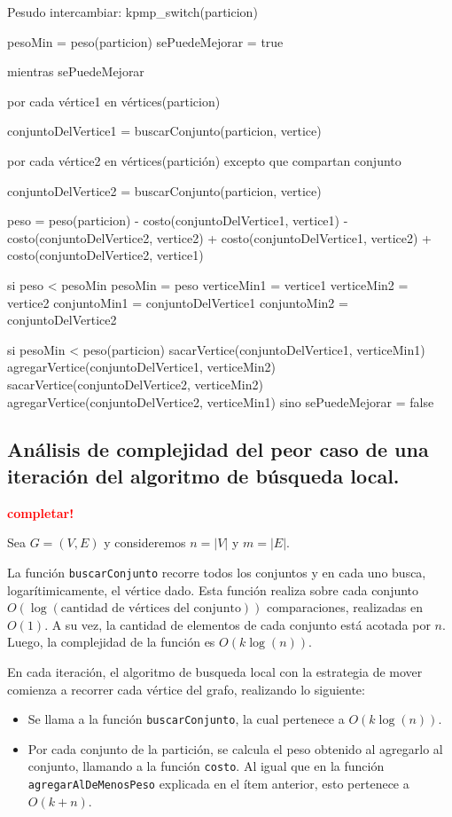 Pesudo intercambiar:
kpmp_switch(particion) {
	pesoMin = peso(particion)
	sePuedeMejorar = true

	mientras sePuedeMejorar {
		por cada vértice1 en vértices(particion) {
			conjuntoDelVertice1 = buscarConjunto(particion, vertice)

			por cada vértice2 en vértices(partición) excepto que compartan conjunto {
				conjuntoDelVertice2 = buscarConjunto(particion, vertice)

				peso = peso(particion)
					- costo(conjuntoDelVertice1, vertice1)
					- costo(conjuntoDelVertice2, vertice2)
					+ costo(conjuntoDelVertice1, vertice2)
					+ costo(conjuntoDelVertice2, vertice1)


				si peso < pesoMin {
					pesoMin = peso
					verticeMin1 = vertice1
					verticeMin2 = vertice2
					conjuntoMin1 = conjuntoDelVertice1
					conjuntoMin2 = conjuntoDelVertice2
				}
			}
		}

		si pesoMin < peso(particion) {
			sacarVertice(conjuntoDelVertice1, verticeMin1)
			agregarVertice(conjuntoDelVertice1, verticeMin2)
			sacarVertice(conjuntoDelVertice2, verticeMin2)
			agregarVertice(conjuntoDelVertice2, verticeMin1)
		} sino {
			sePuedeMejorar = false
		}
	}
}

\newpage
\subsection{Análisis de complejidad del peor caso de una iteración del
            algoritmo de búsqueda local.}
\vspace*{0.3cm}
\textcolor{red}{\textbf{completar!}}

Sea $G = (V, E)$ y consideremos $n = |V|$ y $m = |E|$.

La función \texttt{buscarConjunto} recorre todos los conjuntos y en cada uno
busca, logarítimicamente, el vértice dado. Esta función realiza sobre cada
conjunto $O(\log(\text{cantidad de vértices del conjunto}))$ comparaciones,
realizadas en $O(1)$. A su vez, la cantidad de elementos de cada conjunto está
acotada por $n$. Luego, la complejidad de la función es $O(k\log(n))$.

\vspace*{0.3cm}

En cada iteración, el algoritmo de busqueda local con la estrategia de mover
comienza a recorrer cada vértice del grafo, realizando lo siguiente:
\begin{itemize}
  \item Se llama a la función \texttt{buscarConjunto}, la cual pertenece a
  $O(k\log(n))$.
  \item Por cada conjunto de la partición, se calcula el peso obtenido al
  agregarlo al conjunto, llamando a la función \texttt{costo}. Al igual que en
  la función \texttt{agregarAlDeMenosPeso} explicada en el ítem anterior, esto
  pertenece a $O(k + n)$.
\end{itemize}

